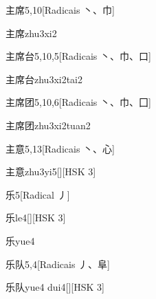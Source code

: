 \begin{entry}{主席}{5,10}[Radicais ⼂、⼱]
  \begin{phonetics}{主席}{zhu3xi2}
  \end{phonetics}
\end{entry}

\begin{entry}{主席台}{5,10,5}[Radicais ⼂、⼱、⼝]
  \begin{phonetics}{主席台}{zhu3xi2tai2}
  \end{phonetics}
\end{entry}

\begin{entry}{主席团}{5,10,6}[Radicais ⼂、⼱、⼞]
  \begin{phonetics}{主席团}{zhu3xi2tuan2}
  \end{phonetics}
\end{entry}

\begin{entry}{主意}{5,13}[Radicais ⼂、⼼]
  \begin{phonetics}{主意}{zhu3yi5}[][HSK 3]
  \end{phonetics}
\end{entry}

\begin{entry}{乐}{5}[Radical ⼃]
  \begin{phonetics}{乐}{le4}[][HSK 3]
  \end{phonetics}
  \begin{phonetics}{乐}{yue4}
  \end{phonetics}
\end{entry}

\begin{entry}{乐队}{5,4}[Radicais ⼃、⾩]
  \begin{phonetics}{乐队}{yue4 dui4}[][HSK 3]
  \end{phonetics}
\end{entry}

